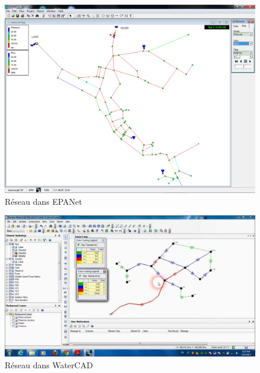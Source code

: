 \documentclass[a4paper, 11pt]{article}
\begin{document}
\begin{minipage}{\linewidth}
      \centering
      \begin{minipage}{0.45\linewidth}
          \begin{figure}[H]
              \includegraphics[width=\linewidth]{Etude_Comparative_1/epanet}
              \caption{Réseau dans EPANet}
          \end{figure}
      \end{minipage}
      \hspace{0.05\linewidth}
      \begin{minipage}{0.45\linewidth}
          \begin{figure}[H]
              \includegraphics[width=\linewidth]{Etude_Comparative_1/watercad}
              \caption{Réseau dans WaterCAD}
          \end{figure}
      \end{minipage}
  \end{minipage}
\end{document}
